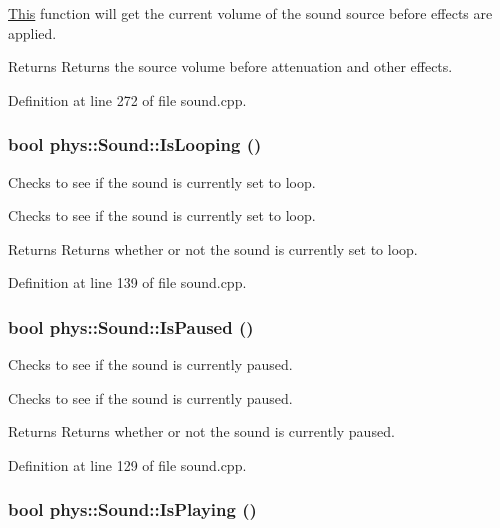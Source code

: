 \hyperlink{structThis}{This} function will get the current volume of the sound source before effects are applied. \begin{DoxyReturn}{Returns}
Returns the source volume before attenuation and other effects. 
\end{DoxyReturn}


Definition at line 272 of file sound.cpp.

\hypertarget{classphys_1_1Sound_a67f4a5475bc634c8ee894933cc09f933}{
\subsubsection[{IsLooping}]{\setlength{\rightskip}{0pt plus 5cm}bool phys::Sound::IsLooping ()}}
\label{dc/d2f/classphys_1_1Sound_a67f4a5475bc634c8ee894933cc09f933}


Checks to see if the sound is currently set to loop. 

Checks to see if the sound is currently set to loop. \begin{DoxyReturn}{Returns}
Returns whether or not the sound is currently set to loop. 
\end{DoxyReturn}


Definition at line 139 of file sound.cpp.

\hypertarget{classphys_1_1Sound_a21ad445ca3e3b4836ee838c41584d8c1}{
\subsubsection[{IsPaused}]{\setlength{\rightskip}{0pt plus 5cm}bool phys::Sound::IsPaused ()}}
\label{dc/d2f/classphys_1_1Sound_a21ad445ca3e3b4836ee838c41584d8c1}


Checks to see if the sound is currently paused. 

Checks to see if the sound is currently paused. \begin{DoxyReturn}{Returns}
Returns whether or not the sound is currently paused. 
\end{DoxyReturn}


Definition at line 129 of file sound.cpp.

\hypertarget{classphys_1_1Sound_a382b26fd5289da4fdb2b536e953b7ea0}{
\subsubsection[{IsPlaying}]{\setlength{\rightskip}{0pt plus 5cm}bool phys::Sound::IsPlaying ()}}
\label{dc/d2f/classphys_1_1Sound_a382b26fd5289da4fdb2b536e953b7ea0}



